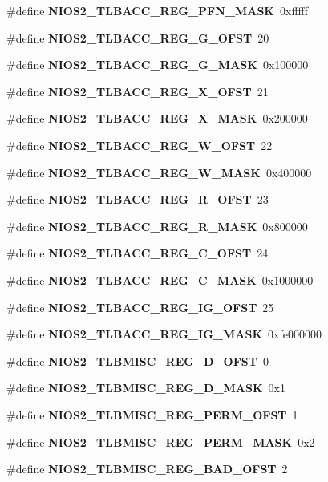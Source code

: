 \begin{DoxyCompactItemize}
\item 
\#define {\bf N\+I\+O\+S2\+\_\+\+T\+L\+B\+A\+C\+C\+\_\+\+R\+E\+G\+\_\+\+P\+F\+N\+\_\+\+M\+A\+SK}~0xfffff
\item 
\#define {\bf N\+I\+O\+S2\+\_\+\+T\+L\+B\+A\+C\+C\+\_\+\+R\+E\+G\+\_\+\+G\+\_\+\+O\+F\+ST}~20
\item 
\#define {\bf N\+I\+O\+S2\+\_\+\+T\+L\+B\+A\+C\+C\+\_\+\+R\+E\+G\+\_\+\+G\+\_\+\+M\+A\+SK}~0x100000
\item 
\#define {\bf N\+I\+O\+S2\+\_\+\+T\+L\+B\+A\+C\+C\+\_\+\+R\+E\+G\+\_\+\+X\+\_\+\+O\+F\+ST}~21
\item 
\#define {\bf N\+I\+O\+S2\+\_\+\+T\+L\+B\+A\+C\+C\+\_\+\+R\+E\+G\+\_\+\+X\+\_\+\+M\+A\+SK}~0x200000
\item 
\#define {\bf N\+I\+O\+S2\+\_\+\+T\+L\+B\+A\+C\+C\+\_\+\+R\+E\+G\+\_\+\+W\+\_\+\+O\+F\+ST}~22
\item 
\#define {\bf N\+I\+O\+S2\+\_\+\+T\+L\+B\+A\+C\+C\+\_\+\+R\+E\+G\+\_\+\+W\+\_\+\+M\+A\+SK}~0x400000
\item 
\#define {\bf N\+I\+O\+S2\+\_\+\+T\+L\+B\+A\+C\+C\+\_\+\+R\+E\+G\+\_\+\+R\+\_\+\+O\+F\+ST}~23
\item 
\#define {\bf N\+I\+O\+S2\+\_\+\+T\+L\+B\+A\+C\+C\+\_\+\+R\+E\+G\+\_\+\+R\+\_\+\+M\+A\+SK}~0x800000
\item 
\#define {\bf N\+I\+O\+S2\+\_\+\+T\+L\+B\+A\+C\+C\+\_\+\+R\+E\+G\+\_\+\+C\+\_\+\+O\+F\+ST}~24
\item 
\#define {\bf N\+I\+O\+S2\+\_\+\+T\+L\+B\+A\+C\+C\+\_\+\+R\+E\+G\+\_\+\+C\+\_\+\+M\+A\+SK}~0x1000000
\item 
\#define {\bf N\+I\+O\+S2\+\_\+\+T\+L\+B\+A\+C\+C\+\_\+\+R\+E\+G\+\_\+\+I\+G\+\_\+\+O\+F\+ST}~25
\item 
\#define {\bf N\+I\+O\+S2\+\_\+\+T\+L\+B\+A\+C\+C\+\_\+\+R\+E\+G\+\_\+\+I\+G\+\_\+\+M\+A\+SK}~0xfe000000
\item 
\#define {\bf N\+I\+O\+S2\+\_\+\+T\+L\+B\+M\+I\+S\+C\+\_\+\+R\+E\+G\+\_\+\+D\+\_\+\+O\+F\+ST}~0
\item 
\#define {\bf N\+I\+O\+S2\+\_\+\+T\+L\+B\+M\+I\+S\+C\+\_\+\+R\+E\+G\+\_\+\+D\+\_\+\+M\+A\+SK}~0x1
\item 
\#define {\bf N\+I\+O\+S2\+\_\+\+T\+L\+B\+M\+I\+S\+C\+\_\+\+R\+E\+G\+\_\+\+P\+E\+R\+M\+\_\+\+O\+F\+ST}~1
\item 
\#define {\bf N\+I\+O\+S2\+\_\+\+T\+L\+B\+M\+I\+S\+C\+\_\+\+R\+E\+G\+\_\+\+P\+E\+R\+M\+\_\+\+M\+A\+SK}~0x2
\item 
\#define {\bf N\+I\+O\+S2\+\_\+\+T\+L\+B\+M\+I\+S\+C\+\_\+\+R\+E\+G\+\_\+\+B\+A\+D\+\_\+\+O\+F\+ST}~2

\end{DoxyCompactItemize}
